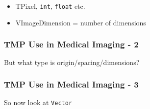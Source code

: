 \begin{Shaded}
\begin{Highlighting}[]

\NormalTok{< }    \NormalTok{>}
  
\NormalTok{\{}
\NormalTok{:}
\end{Highlighting}
\end{Shaded}

\begin{itemize}
\itemsep1pt\parskip0pt
\item
  TPixel, \texttt{int}, \texttt{float} etc.
\item
  VImageDimension = number of dimensions
\end{itemize}

\subsubsection{TMP Use in Medical Imaging -
2}\label{tmp-use-in-medical-imaging---2}

But what type is origin/spacing/dimensions?

\begin{Shaded}
\begin{Highlighting}[]
\NormalTok{< }   \NormalTok{>}
  
\NormalTok{\{}
   
   
\end{Highlighting}
\end{Shaded}

\subsubsection{TMP Use in Medical Imaging -
3}\label{tmp-use-in-medical-imaging---3}

So now look at \texttt{Vector}

\begin{Shaded}
\begin{Highlighting}[]
\NormalTok{< }    \NormalTok{>}
  
\NormalTok{\{}
\NormalTok{:}
\end{Highlighting}
\end{Shaded}

